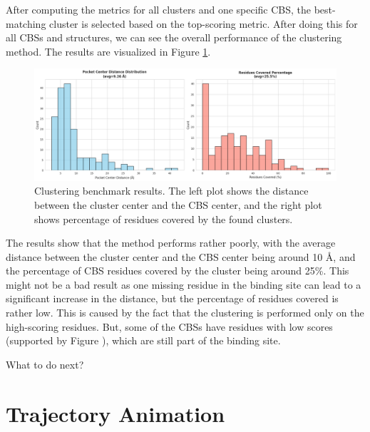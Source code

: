 After computing the metrics for all clusters and one specific CBS, the best-matching cluster is selected based on the top-scoring metric. After doing this for all CBSs and structures, we can see the overall performance of the clustering method. The results are visualized in Figure \ref{fig:clustering-benchmark}.

\begin{figure}[htbp]
    \centering
    \includegraphics[width=\textwidth]{img/non-smoothened-1.png}
    \caption{Clustering benchmark results. The left plot shows the distance between the cluster center and the CBS center, and the right plot shows percentage of residues covered by the found clusters.}
    \label{fig:clustering-benchmark}
\end{figure}

The results show that the method performs rather poorly, with the average distance between the cluster center and the CBS center being around 10 \AA, and the percentage of CBS residues covered by the cluster being around 25\%. This might not be a bad result as one missing residue in the binding site can lead to a significant increase in the distance, but the percentage of residues covered is rather low. This is caused by the fact that the clustering is performed only on the high-scoring residues. But, some of the CBSs have residues with low scores (supported by Figure ), which are still part of the binding site.

What to do next?


\section{Trajectory Animation}
\label{sec:trajectory}

